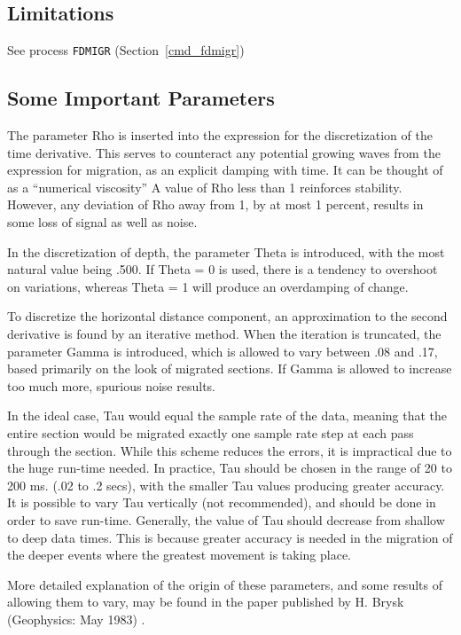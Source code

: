 \subsection{Limitations}

See process \texttt{FDMIGR} (Section~\ref{cmd_fdmigr})

\subsection{Some Important Parameters}

The parameter Rho is inserted into the expression for the discretization
of the time derivative. This serves to counteract any potential growing
waves from the expression for migration, as an explicit damping with time.
It can be thought of as a ``numerical viscosity''  A value of Rho less
than 1 reinforces stability.  However, any deviation of Rho away from 1,
by at most 1 percent,  results in some loss of signal as well as noise.

In the discretization of depth, the parameter Theta is introduced, with
the most natural value being .500.  If Theta = 0 is used, there is a
tendency to overshoot on variations, whereas   Theta = 1 will produce an
overdamping of change.

To discretize the horizontal distance component, an approximation to the
second derivative is found by an iterative method.  When the iteration is
truncated, the parameter Gamma is introduced, which is allowed to vary
between .08 and .17, based primarily on the look of migrated sections.
If Gamma is allowed to increase too much more, spurious noise results.

In the ideal case, Tau would equal the sample rate of the data, meaning
that the entire section would be migrated exactly one sample rate step
at each pass through the section. While this scheme reduces the errors,
it is impractical due to the huge run-time needed. In practice, Tau should
be chosen in the range of 20 to 200 ms. (.02 to .2 secs), with the smaller
Tau values producing greater accuracy.  It is possible to vary Tau
vertically (not recommended), and should be done in order to save run-time.
Generally, the value of Tau should decrease from shallow to deep data
times. This is because greater accuracy is needed in the migration of the
deeper events where the greatest movement is taking place.

More detailed explanation of the origin of these parameters, and some
results of allowing them to vary, may be found in the paper published
by H. Brysk (Geophysics: May 1983) \cite{Brysk1983}.

